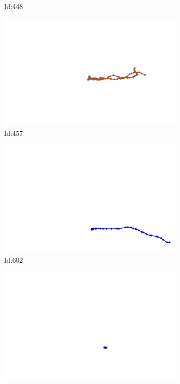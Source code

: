 \documentclass[12pt,twoside]{report}
\begin{document}
\begin{figure}
\begin{subfigure}[b]{0.20\textwidth}
\caption{Id:448}
\end{subfigure}
\begin{subfigure}[b]{0.20\textwidth}
\centering
\includegraphics[width=\textwidth]{../trajectories/457.png}
\caption{Id:457}
\end{subfigure}
\begin{subfigure}[b]{0.20\textwidth}
\centering
\includegraphics[width=\textwidth]{../trajectories/602.png}
\caption{Id:602}
\end{subfigure}
\begin{subfigure}[b]{0.20\textwidth}
\centering
\includegraphics[width=\textwidth]{../trajectories/658.png}

\end{subfigure}
\end{figure}
\end{document}
